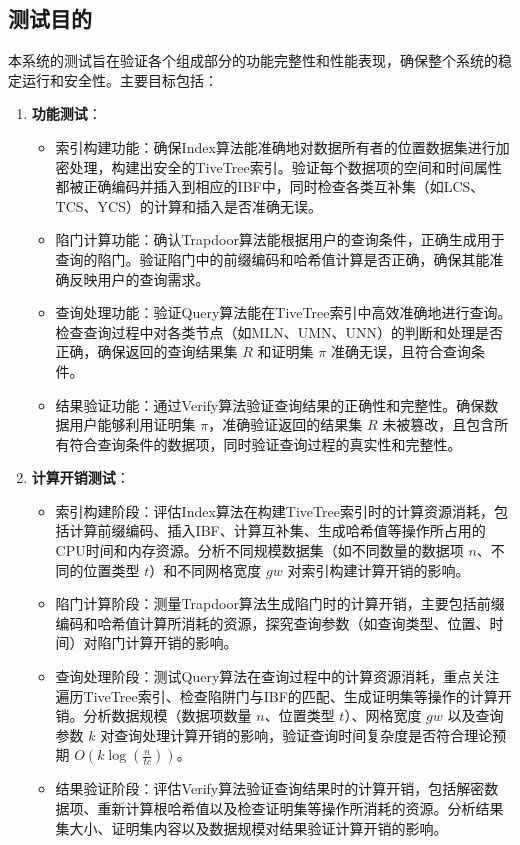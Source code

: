 \documentclass{cumcmthesis}
\numberwithin{equation}{section} %
\numberwithin{figure}{section} %
\numberwithin{table}{section} %
\begin{document}
\subsection{测试目的}
本系统的测试旨在验证各个组成部分的功能完整性和性能表现，确保整个系统的稳定运行和安全性。主要目标包括：
\begin{enumerate}
    \item \textbf{功能测试}：
        \begin{itemize}
            \item 索引构建功能：确保Index算法能准确地对数据所有者的位置数据集进行加密处理，构建出安全的TiveTree索引。验证每个数据项的空间和时间属性都被正确编码并插入到相应的IBF中，同时检查各类互补集（如LCS、TCS、YCS）的计算和插入是否准确无误。
            \item 陷门计算功能：确认Trapdoor算法能根据用户的查询条件，正确生成用于查询的陷门。验证陷门中的前缀编码和哈希值计算是否正确，确保其能准确反映用户的查询需求。
            \item 查询处理功能：验证Query算法能在TiveTree索引中高效准确地进行查询。检查查询过程中对各类节点（如MLN、UMN、UNN）的判断和处理是否正确，确保返回的查询结果集 \(R\) 和证明集 \(\pi\) 准确无误，且符合查询条件。
            \item 结果验证功能：通过Verify算法验证查询结果的正确性和完整性。确保数据用户能够利用证明集 \(\pi\)，准确验证返回的结果集 \(R\) 未被篡改，且包含所有符合查询条件的数据项，同时验证查询过程的真实性和完整性。 
        \end{itemize}
    \item \textbf{计算开销测试}：
        \begin{itemize}
            \item 索引构建阶段：评估Index算法在构建TiveTree索引时的计算资源消耗，包括计算前缀编码、插入IBF、计算互补集、生成哈希值等操作所占用的CPU时间和内存资源。分析不同规模数据集（如不同数量的数据项 \(n\)、不同的位置类型 \(t\)）和不同网格宽度 \(gw\) 对索引构建计算开销的影响。
            \item 陷门计算阶段：测量Trapdoor算法生成陷门时的计算开销，主要包括前缀编码和哈希值计算所消耗的资源，探究查询参数（如查询类型、位置、时间）对陷门计算开销的影响。
            \item 查询处理阶段：测试Query算法在查询过程中的计算资源消耗，重点关注遍历TiveTree索引、检查陷阱门与IBF的匹配、生成证明集等操作的计算开销。分析数据规模（数据项数量 \(n\)、位置类型 \(t\)）、网格宽度 \(gw\) 以及查询参数 \(k\) 对查询处理计算开销的影响，验证查询时间复杂度是否符合理论预期 \(O(k \log (\frac{n}{t c}))\)。
            \item 结果验证阶段：评估Verify算法验证查询结果时的计算开销，包括解密数据项、重新计算根哈希值以及检查证明集等操作所消耗的资源。分析结果集大小、证明集内容以及数据规模对结果验证计算开销的影响。

\end{itemize}
\end{enumerate}
\end{document}
